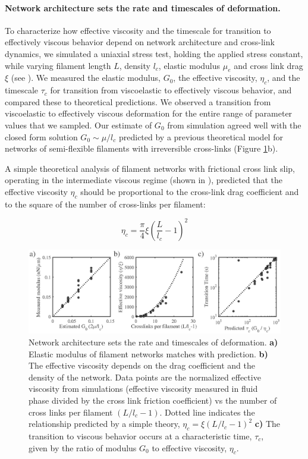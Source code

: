 \documentclass[10pt,letterpaper]{article}
\begin{document}
\paragraph{Network architecture sets the rate and timescales of deformation.}  To characterize how effective viscosity and the timescale for transition to effectively viscous behavior depend on network architecture and cross-link dynamics, we simulated a uniaxial stress test, holding the applied stress constant, while varying filament length $L$, density $l_c$,  elastic modulus $\mu_e$ and cross link drag $\xi$ (see ). We measured the elastic modulus, $G_0$, the effective viscosity, $\eta_c$, and the timescale $\tau_c$ for transition from viscoelastic to effectively viscous behavior, and compared these to theoretical predictions. We observed a transition from viscoelastic to effectively viscous deformation for the entire range of parameter values that we sampled.  Our estimate of $G_0$ from simulation agreed well with the closed form solution  $G_0 \sim \mu/l_c$ predicted by a previous theoretical model \cite{theo_hlm} for networks of semi-flexible filaments with irreversible cross-links (Figure \ref{fig:passive_form}b). 

A simple theoretical analysis of filament networks with frictional cross link slip, operating in the intermediate viscous regime (shown in ), predicted that the effective viscosity $\eta_c$ should be proportional to the cross-link drag coefficient and to the square of the number of cross-links per filament:

\begin{equation}
\eta_c = \frac{\pi}{4}\xi\left ( \frac{L}{l_c}-1\right )^2
\end{equation}


\begin{figure}[h!]
\centering
\includegraphics[width=\hsize]{figures/figure3}
\caption{\label{fig:passive_form} Network architecture sets the rate and timescales of deformation.  \textbf{a)} Elastic modulus of filament networks matches with prediction.  \textbf{b)} The effective viscosity depends on the drag coefficient and the density of the network. Data points are the normalized effective viscosity from simulations (effective viscosity measured in fluid phase divided by the cross link friction coefficient) vs the number of cross links per filament $(L/l_c - 1)$.  Dotted line indicates the relationship predicted by a simple theory, $\eta_c = \xi(L/l_c-1)^2$ \textbf{c)} The transition to viscous behavior occurs at a characteristic time, $\tau_c$, given by the ratio of modulus $G_0$ to effective viscosity, $\eta_c$.  }
\end{figure}
\end{document}

